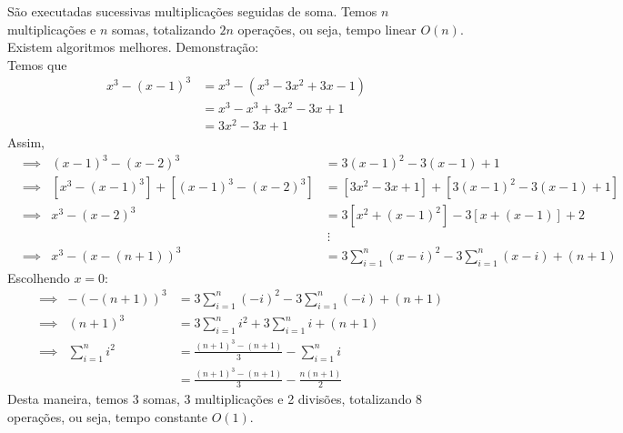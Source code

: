 \documentclass{homework}
\begin{document}
	\subsubquest São executadas sucessivas multiplicações seguidas de soma.
	\subsubquest Temos $n$ multiplicações e $n$ somas, totalizando $2n$ operações, ou seja, tempo linear $O(n)$.
	\subsubquest Existem algoritmos melhores. Demonstração:\\
	Temos que
	\begin{align*}
		x^3 - (x-1)^3 &= x^3 - (x^3 - 3x^2 + 3x - 1)\\
					  &= x^3 - x^3 + 3x^2 - 3x + 1\\
					  &= 3x^2 - 3x + 1
	\end{align*}
	Assim,
	\begin{align*}
		&\implies& (x-1)^3 - (x-2)^3 &= 3(x-1)^2 - 3(x-1) + 1\\
		&\implies& [x^3 - (x-1)^3] + [(x-1)^3 - (x-2)^3] &= [3x^2 - 3x + 1] + [3(x-1)^2 - 3(x-1) + 1]\\
		&\implies& x^3 - (x-2)^3 &= 3[x^2 + (x-1)^2] - 3[x + (x-1)] + 2\\
		& & &~\vdots\\
		&\implies& x^3 - (x-(n+1))^3 &= 3\sum_{i=1}^{n}(x-i)^2 - 3\sum_{i=1}^n(x-i) + (n+1)
	\end{align*}
	Escolhendo $x = 0$:
	\begin{align*}
	&\implies& -(-(n+1))^3 &= 3\sum_{i=1}^{n}(-i)^2 - 3\sum_{i=1}^n(-i) + (n+1)\\
	&\implies&     (n+1)^3 &= 3\sum_{i=1}^{n} i^2 + 3\sum_{i=1}^n i + (n+1)\\
	&\implies& \sum_{i=1}^{n} i^2 &= \frac{(n+1)^3 - (n+1)}{3} - \sum_{i=1}^n i\\
	&        &					  &= \frac{(n+1)^3 - (n+1)}{3} - \frac{n (n+1)}{2}
	\end{align*}
	Desta maneira, temos 3 somas, 3 multiplicações e 2 divisões, totalizando 8 operações, ou seja, tempo constante $O(1)$.
\end{document}
